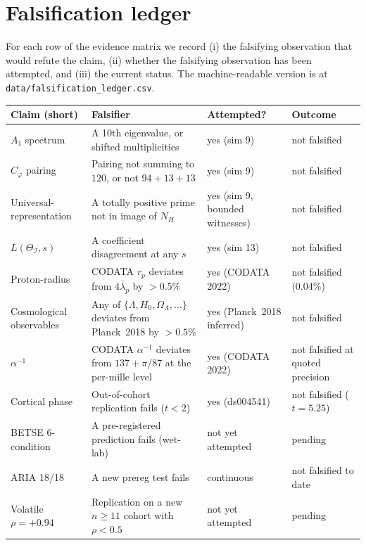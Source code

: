 \documentclass[11pt,a4paper]{article}
\newcommand{\II}{\mathcal{I}}
\newcommand{\Cphi}{C_\varphi}
\newcommand{\NH}{N_H}
\begin{document}
\section{Falsification ledger}
\label{app:falsifier}

For each row of the evidence matrix we record (i) the falsifying
observation that would refute the claim, (ii) whether the
falsifying observation has been attempted, and (iii) the current
status. The machine-readable version is at
\texttt{data/falsification\_ledger.csv}.

\begin{small}
\begin{longtable}{p{3.4cm}p{5.4cm}p{2.4cm}p{2.0cm}}
\toprule
\textbf{Claim (short)} & \textbf{Falsifier} & \textbf{Attempted?}
& \textbf{Outcome} \\
\midrule
\endhead
$A_1$ spectrum & A 10th eigenvalue, or shifted multiplicities
& yes (sim 9) & not falsified \\
$\Cphi$ pairing & Pairing not summing to $120$, or not $94+13+13$
& yes (sim 9) & not falsified \\
Universal-representation & A totally positive prime not in image of $\NH$
& yes (sim 9, bounded witnesses) & not falsified \\
$L(\Theta_\II,s)$ & A coefficient disagreement at any $s$
& yes (sim 13) & not falsified \\
Proton-radius & CODATA $r_p$ deviates from $4\bar\lambda_p$ by $>0.5\%$
& yes (CODATA 2022) & not falsified (0.04\%) \\
Cosmological observables & Any of $\{\Lambda, H_0, \Omega_\Lambda,\dots\}$ deviates from Planck~2018 by $> 0.5\%$
& yes (Planck~2018 inferred) & not falsified \\
$\alpha^{-1}$ & CODATA $\alpha^{-1}$ deviates from $137+\pi/87$ at the per-mille level
& yes (CODATA 2022) & not falsified at quoted precision \\
Cortical phase & Out-of-cohort replication fails ($t<2$)
& yes (ds004541) & not falsified ($t=5.25$) \\
BETSE 6-condition & A pre-registered prediction fails (wet-lab)
& not yet attempted & pending \\
ARIA 18/18 & A new prereg test fails
& continuous & not falsified to date \\
Volatile $\rho=+0.94$ & Replication on a new $n \geq 11$ cohort with $\rho < 0.5$
& not yet attempted & pending \\
\bottomrule
\end{longtable}
\end{small}
\end{document}
